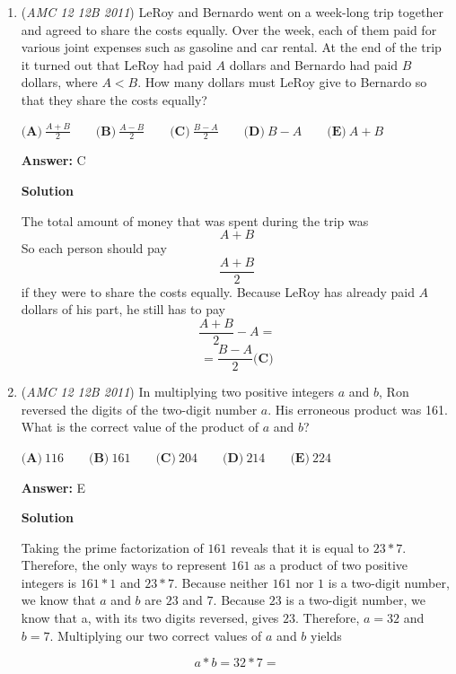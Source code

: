 \begin{enumerate}
 \[385+x = 480\]

 \[x = \boxed{95 \textbf{(E)}}\]



	\item (\textit{AMC 12 12B 2011}) LeRoy and Bernardo went on a week-long trip together and agreed to share the costs equally.  Over the week, each of them paid for various joint expenses such as gasoline and car rental.  At the end of the trip it turned out that LeRoy had paid $A$ dollars and Bernardo had paid $B$ dollars, where $A<B$.  How many dollars must LeRoy give to Bernardo so that they share the costs equally?


 $\textbf{(A)}\ \frac{A+B}{2} \qquad \textbf{(B)}\ \frac{A-B}{2} \qquad \textbf{(C)}\ \frac{B-A}{2} \qquad \textbf{(D)}\ B-A \qquad \textbf{(E)}\ A+B$

 \textbf{Answer: }C



\textbf{Solution}

The total amount of money that was spent during the trip was
 \[A + B\]So each person should pay
 \[\frac{A+B}{2}\]if they were to share the costs equally. Because LeRoy has already paid $A$ dollars of his part, he still has to pay
 \[\frac{A+B}{2} - A =\]
 \[= \boxed{\frac{B-A}{2} \textbf{(C)}}\]



	\item (\textit{AMC 12 12B 2011}) In multiplying two positive integers $a$ and $b$, Ron reversed the digits of the two-digit number $a$.  His erroneous product was 161.  What is the correct value of the product of $a$ and $b$?


 $\textbf{(A)}\ 116 \qquad \textbf{(B)}\ 161 \qquad \textbf{(C)}\ 204 \qquad \textbf{(D)}\ 214 \qquad \textbf{(E)}\ 224$

 \textbf{Answer: }E



\textbf{Solution}

Taking the prime factorization of $161$ reveals that it is equal to $23*7.$ Therefore, the only ways to represent $161$ as a product of two positive integers is $161*1$ and $23*7.$ Because neither $161$ nor $1$ is a two-digit number, we know that $a$ and $b$ are $23$ and $7.$ Because $23$ is a two-digit number, we know that a, with its two digits reversed, gives $23.$ Therefore, $a = 32$ and $b = 7.$ Multiplying our two correct values of $a$ and $b$ yields

 
 \[a*b = 32*7 =\]


\end{enumerate}

